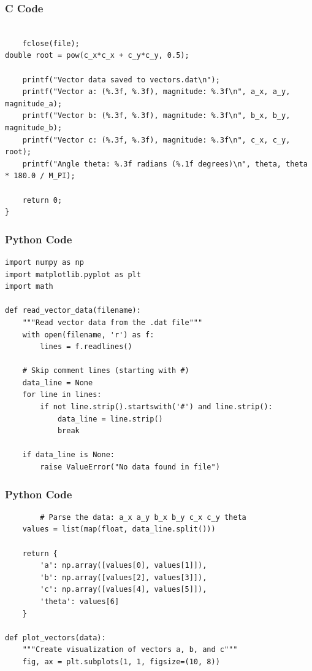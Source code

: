 \documentclass{beamer}
\begin{document}
\begin{frame}[fragile]
    \frametitle{C Code}
\begin{lstlisting}   

    fclose(file);
double root = pow(c_x*c_x + c_y*c_y, 0.5);

    printf("Vector data saved to vectors.dat\n");
    printf("Vector a: (%.3f, %.3f), magnitude: %.3f\n", a_x, a_y, magnitude_a);
    printf("Vector b: (%.3f, %.3f), magnitude: %.3f\n", b_x, b_y, magnitude_b);
    printf("Vector c: (%.3f, %.3f), magnitude: %.3f\n", c_x, c_y, root);
    printf("Angle theta: %.3f radians (%.1f degrees)\n", theta, theta * 180.0 / M_PI);

    return 0;
}
\end{lstlisting}
\end{frame}

\begin{frame}[fragile]
    \frametitle{Python Code}
    \begin{lstlisting}
import numpy as np
import matplotlib.pyplot as plt
import math

def read_vector_data(filename):
    """Read vector data from the .dat file"""
    with open(filename, 'r') as f:
        lines = f.readlines()

    # Skip comment lines (starting with #)
    data_line = None
    for line in lines:
        if not line.strip().startswith('#') and line.strip():
            data_line = line.strip()
            break

    if data_line is None:
        raise ValueError("No data found in file")
    \end{lstlisting}
\end{frame}

\begin{frame}[fragile]
    \frametitle{Python Code}
    \begin{lstlisting}
        # Parse the data: a_x a_y b_x b_y c_x c_y theta
    values = list(map(float, data_line.split()))

    return {
        'a': np.array([values[0], values[1]]),
        'b': np.array([values[2], values[3]]),
        'c': np.array([values[4], values[5]]),
        'theta': values[6]
    }

def plot_vectors(data):
    """Create visualization of vectors a, b, and c"""
    fig, ax = plt.subplots(1, 1, figsize=(10, 8))
    \end{lstlisting}
\end{frame}
\end{document}
